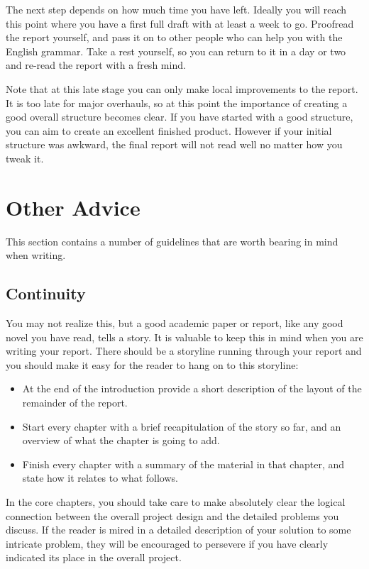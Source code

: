 \documentclass[]{final_report}
\begin{document}
The next step depends on how much time you have left. Ideally you will reach this point where you have a first full draft with at least a week to go. Proofread the report yourself, and pass it on to other people who can help you with the English grammar. Take a rest yourself, so you can return to it in a day or two and re-read the report with a fresh mind.

Note that at this late stage you can only make local improvements to the report. It is too late for major overhauls, so at this point the importance of creating a good overall structure becomes clear. If you have started with a good structure, you can aim to create an excellent finished product. However if your initial structure was awkward, the final report will not read well no matter how you tweak it.

\section{Other Advice}

This section contains a number of guidelines that are worth bearing in mind when writing.


\subsection{Continuity}

You may not realize this, but a good academic paper or report, like any good novel you have read, tells a story. It is valuable to keep this in mind when you are writing your report. There should be a storyline running through your report and you should make it easy for the reader to hang on to this storyline:

\begin{itemize}
\item At the end of the introduction provide a short description of the layout of
the remainder of the report.
\item Start every chapter with a brief recapitulation of the story so far, and an
overview of what the chapter is going to add.
\item Finish every chapter with a summary of the material in that chapter, and
state how it relates to what follows.
\end{itemize}

In the core chapters, you should take care to make absolutely clear the logical connection between the overall project design and the detailed problems you discuss. If the reader is mired in a detailed description of your solution to some intricate problem, they will be encouraged to persevere if you have clearly indicated its place in the overall project.
\end{document}

